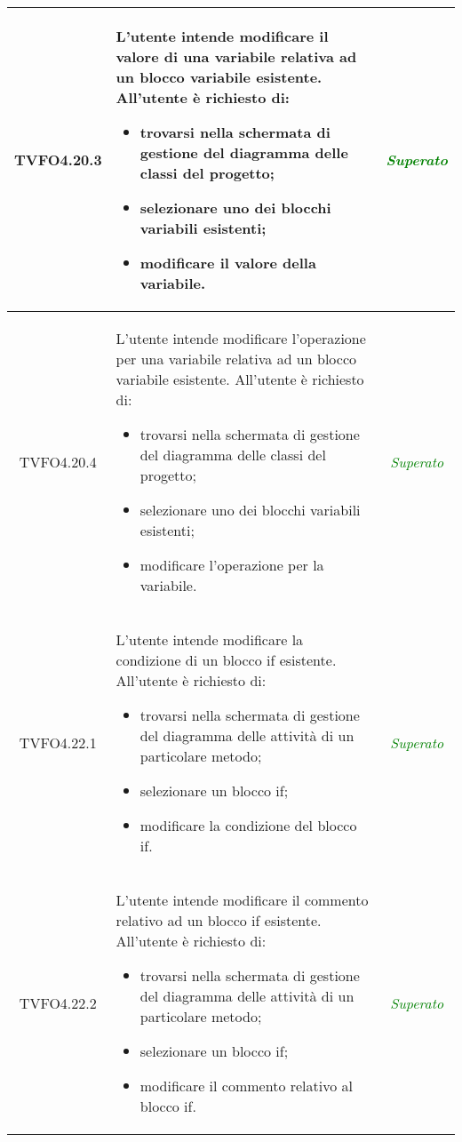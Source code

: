 \begin{longtable}{|c|>{}m{8cm}|c|}
\hypertarget{TVFO4.20.3}{TVFO4.20.3} & L'utente intende modificare il valore di una variabile relativa ad un blocco variabile esistente.
All'utente è richiesto di:
\begin{itemize}
	\item trovarsi nella schermata di gestione del diagramma delle classi del progetto;
	\item selezionare uno dei blocchi variabili esistenti;
	\item modificare il valore della variabile.
\end{itemize} & \textcolor{Green}{\textit{Superato}}\\ \hline

\hypertarget{TVFO4.20.4}{TVFO4.20.4} & L'utente intende modificare l'operazione per una variabile relativa ad un blocco variabile esistente.
All'utente è richiesto di:
\begin{itemize}
	\item trovarsi nella schermata di gestione del diagramma delle classi del progetto;
	\item selezionare uno dei blocchi variabili esistenti;
	\item modificare l'operazione per la variabile.
\end{itemize} & \textcolor{Green}{\textit{Superato}}\\ \hline

\hypertarget{TVFO4.22.1}{TVFO4.22.1} & L'utente intende modificare la condizione di un blocco if esistente.
All'utente è richiesto di:
\begin{itemize}
	\item trovarsi nella schermata di gestione del diagramma delle attività di un particolare metodo;
	\item selezionare un blocco if;
	\item modificare la condizione del blocco if.
\end{itemize} & \textcolor{Green}{\textit{Superato}}\\ \hline

\hypertarget{TVFO4.22.2}{TVFO4.22.2} & L'utente intende modificare il commento relativo ad un blocco if esistente.
All'utente è richiesto di:
\begin{itemize}
	\item trovarsi nella schermata di gestione del diagramma delle attività di un particolare metodo;
	\item selezionare un blocco if;
	\item modificare il commento relativo al blocco if.
\end{itemize} & \textcolor{Green}{\textit{Superato}}\\ \hline


\end{longtable}
